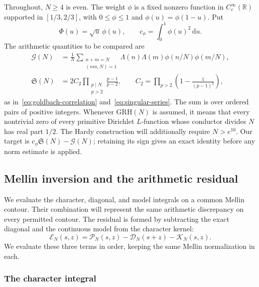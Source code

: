 \documentclass[12pt,a4paper]{amsart}
\numberwithin{equation}{section}
\def\le{\leqslant}
\def\ge{\geqslant}
\theoremstyle{plain}
\theoremstyle{definition}
\theoremstyle{remark}
\begin{document}
Throughout, $N\ge4$ is even. The weight $\phi$ is a fixed nonzero
function in $C_c^\infty(\mathbb R)$ supported in $[1/3,2/3]$, with
$0\le\phi\le1$ and $\phi(u)=\phi(1-u)$. Put
\[
 \Phi(u)=\sqrt u\,\phi(u),\qquad
 c_\phi=\int_0^1\phi(u)^2\,\mathrm{d}u.
\]
The arithmetic quantities to be compared are
\[
 \begin{aligned}
 \mathcal G(N)&=\frac1N
   \sum_{\substack{n+m=N\\(nm,N)=1}}
       \Lambda(n)\Lambda(m)\phi(n/N)\phi(m/N),\\
 \mathfrak S(N)&=2C_2\prod_{\substack{p\mid N\\p>2}}
                           \frac{p-1}{p-2},\qquad
 C_2=\prod_{p>2}\left(1-\frac1{(p-1)^2}\right),
 \end{aligned}
\]
as in~\eqref{eq:goldbach-correlation} and~\eqref{eq:singular-series}.
The sum is over ordered pairs of positive integers. Whenever
$\mathrm{GRH}(N)$ is assumed, it means that every nontrivial zero
of every primitive Dirichlet $L$-function whose conductor divides
$N$ has real part $1/2$. The Hardy construction will additionally
require $N>e^{10}$.
Our target is $c_\phi\mathfrak S(N)-\mathcal G(N)$; retaining its
sign gives an exact identity before any norm estimate is applied.

\subsection{Mellin inversion and the arithmetic residual}
\label{proof:detail:mellin}

We evaluate the character, diagonal, and model integrals on a common
Mellin contour. Their combination will represent the same arithmetic
discrepancy on every permitted contour. The residual is formed by
subtracting the exact diagonal and the continuous model from the
character kernel:
\[
 \mathscr E_N(s,z)=\mathscr P_N(s,z)
                    -\mathscr D_N(s+z)-\mathscr K_N(s,z).
\]
We evaluate these three terms in order, keeping the same Mellin
normalization in each.

\subsubsection{The character integral}
\label{proof:v7:character-mellin}
\end{document}

